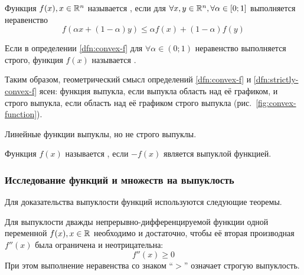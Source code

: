 \begin{dfn}
  \label{dfn:convex-f}
  Функция $f(x), x \in \mathbb{R}^n$ называется , если
  для $\forall x, y \in \mathbb{R}^n, \forall \alpha \in [0;1]$
  выполняется неравенство
  \begin{equation*}
    f(\alpha x + (1-\alpha)y) \leq \alpha f(x) + (1-\alpha) f(y)
  \end{equation*}
\end{dfn}
\begin{dfn}
  \label{dfn:strictly-convex-f}
  Если в определении \ref{dfn:convex-f} для $\forall \alpha \in (0;1)$
  неравенство выполняется строго, функция $f(x)$ называется
  .
\end{dfn}

Таким образом, геометрический смысл определений \ref{dfn:convex-f} и
\ref{dfn:strictly-convex-f} ясен: функция выпукла, если выпукла
область над её графиком, и строго выпукла, если область над её
графиком строго выпукла (рис. \ref{fig:convex-function}).



\begin{rem}
  \label{rem:lin-f-convex}
  Линейные функции выпуклы, но не строго выпуклы.
\end{rem}
\begin{dfn}
  \label{dfn:concave}
  Функция $f(x)$ называется , если $-f(x)$ является
  выпуклой функцией.
\end{dfn}

\subsubsection{Исследование функций и множеств на выпуклость}
\label{sec:convex-analysis}
Для доказательства выпуклости функций используются следующие теоремы.

\begin{thm}
  \label{th:convex-f-diff2}
  Для выпуклости дважды непрерывно-дифференцируемой функции одной
  переменной $f(x), x \in \mathbb{R}$ необходимо и достаточно, чтобы её
  вторая производная $f''(x)$ была ограничена и неотрицательна:
  \begin{equation*}
    f''(x) \geq 0
  \end{equation*}
  При этом выполнение неравенства со знаком {\rm``$>$''\/}\! означает
  строгую выпуклость.
\end{thm}

